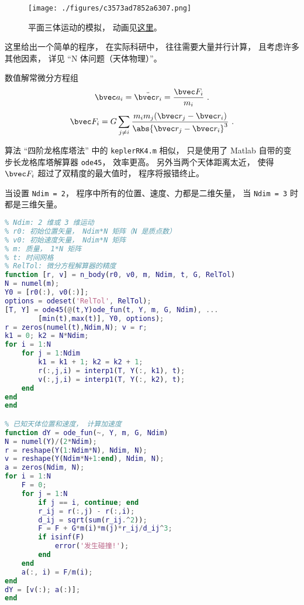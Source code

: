 
\begin{issues}
\issueDraft
\end{issues}


\begin{figure}[ht]
\centering
\texttt{[image: ./figures/c3573ad7852a6307.png]}
\caption{平面三体运动的模拟， 动画见\href{https://wuli.wiki/apps/3body.html}{这里}。} \label{fig_NbodyM_1}
\end{figure}


这里给出一个简单的程序， 在实际科研中， 往往需要大量并行计算， 且考虑许多其他因素， 详见 “N 体问题（天体物理）”。

数值解常微分方程组
\begin{equation}
\bvec a_i = \ddot{\bvec r_i} = \frac{\bvec F_i}{m_i}~.
\end{equation}
\begin{equation}
\bvec F_i = G\sum_{j\ne i} \frac{m_i m_j(\bvec r_j - \bvec r_i)}{\abs{\bvec r_j - \bvec r_i}^3}~.
\end{equation}

算法 “四阶龙格库塔法” 中的 \verb|keplerRK4.m| 相似， 只是使用了 Matlab 自带的变步长龙格库塔解算器 \verb|ode45|， 效率更高。 另外当两个天体距离太近， 使得 $\bvec F_i$ 超过了双精度的最大值时， 程序将报错终止。

当设置 \verb|Ndim = 2|， 程序中所有的位置、速度、力都是二维矢量， 当 \verb|Ndim = 3| 时都是三维矢量。


\begin{lstlisting}[language=matlab, caption=n\_body.m]
% N 体问题（支持二维或三维）
% Ndim: 2 维或 3 维运动
% r0: 初始位置矢量， Ndim*N 矩阵（N 是质点数）
% v0: 初始速度矢量， Ndim*N 矩阵
% m: 质量， 1*N 矩阵
% t: 时间网格
% RelTol: 微分方程解算器的精度
function [r, v] = n_body(r0, v0, m, Ndim, t, G, RelTol)
N = numel(m);
Y0 = [r0(:), v0(:)];
options = odeset('RelTol', RelTol);
[T, Y] = ode45(@(t,Y)ode_fun(t, Y, m, G, Ndim), ...
        [min(t),max(t)], Y0, options);
r = zeros(numel(t),Ndim,N); v = r;
k1 = 0; k2 = N*Ndim;
for i = 1:N
    for j = 1:Ndim
        k1 = k1 + 1; k2 = k2 + 1;
        r(:,j,i) = interp1(T, Y(:, k1), t);
        v(:,j,i) = interp1(T, Y(:, k2), t);
    end
end
end

% 已知天体位置和速度， 计算加速度
function dY = ode_fun(~, Y, m, G, Ndim)
N = numel(Y)/(2*Ndim);
r = reshape(Y(1:Ndim*N), Ndim, N);
v = reshape(Y(Ndim*N+1:end), Ndim, N);
a = zeros(Ndim, N);
for i = 1:N
    F = 0;
    for j = 1:N
        if j == i, continue; end
        r_ij = r(:,j) - r(:,i);
        d_ij = sqrt(sum(r_ij.^2));
        F = F + G*m(i)*m(j)*r_ij/d_ij^3;
        if isinf(F)
            error('发生碰撞!');
        end
    end
    a(:, i) = F/m(i);
end
dY = [v(:); a(:)];
end
\end{lstlisting}

